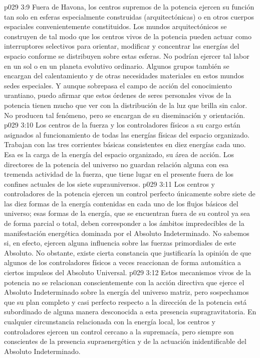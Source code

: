 \vs p029 3:9 \pc Fuera de Havona, los centros supremos de la potencia ejercen su función tan solo en esferas especialmente construidas (arquitectónicas) o en otros cuerpos espaciales convenientemente constituidos. Los mundos arquitectónicos se construyen de tal modo que los centros vivos de la potencia pueden actuar como interruptores selectivos para orientar, modificar y concentrar las energías del espacio conforme se distribuyen sobre estas esferas. No podrían ejercer tal labor en un sol o en un planeta evolutivo ordinario. Algunos grupos también se encargan del calentamiento y de otras necesidades materiales en estos mundos sedes especiales. Y aunque sobrepasa el campo de acción del conocimiento urantiano, puedo afirmar que estos órdenes de seres personales vivos de la potencia tienen mucho que ver con la distribución de la luz que brilla sin calor. No producen tal fenómeno, pero se encargan de su diseminación y orientación.
\vs p029 3:10 \pc Los centros de la fuerza y los controladores físicos a su cargo están asignados al funcionamiento de todas las energías físicas del espacio organizado. Trabajan con las tres corrientes básicas consistentes en diez energías cada uno. Esa es la carga de la energía del espacio organizado, su área de acción. Los directores de la potencia del universo no guardan relación alguna con esa tremenda actividad de la fuerza, que tiene lugar en el presente fuera de los confines actuales de los siete suprauniversos.
\vs p029 3:11 Los centros y controladores de la potencia ejercen un control perfecto únicamente sobre siete de las diez formas de la energía contenidas en cada uno de los flujos básicos del universo; esas formas de la energía, que se encuentran fuera de su control ya sea de forma parcial o total, deben corresponder a los ámbitos impredecibles de la manifestación energética dominada por el Absoluto Indeterminado. No sabemos si, en efecto, ejercen alguna influencia sobre las fuerzas primordiales de este Absoluto. No obstante, existe cierta constancia que justificaría la opinión de que algunos de los controladores físicos a veces reaccionan de forma automática a ciertos impulsos del Absoluto Universal.
\vs p029 3:12 Estos mecanismos vivos de la potencia no se relacionan conscientemente con la acción directiva que ejerce el Absoluto Indeterminado sobre la energía del universo matriz, pero sospechamos que su plan completo y casi perfecto respecto a la dirección de la potencia está subordinado de alguna manera desconocida a esta presencia supragravitatoria. En cualquier circunstancia relacionada con la energía local, los centros y controladores ejercen un control cercano a la supremacía, pero siempre son conscientes de la presencia supraenergética y de la actuación inidentificable del Absoluto Indeterminado.
